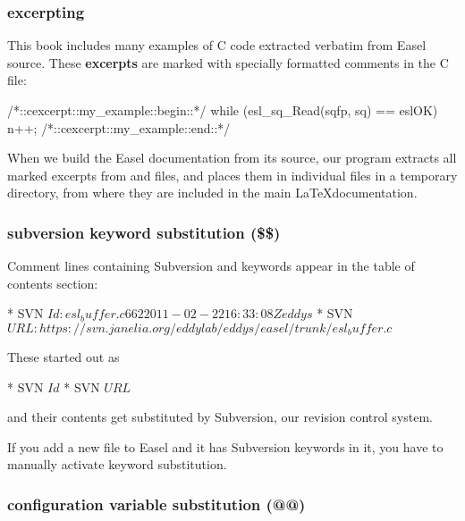 \subsubsection{excerpting}

This book includes many examples of C code extracted verbatim from
Easel source.  These {\bfseries excerpts} are marked with specially
formatted comments in the C file:

\begin{cchunk}
/*::cexcerpt::my_example::begin::*/
   while (esl_sq_Read(sqfp, sq) == eslOK)
     { n++; }
/*::cexcerpt::my_example::end::*/
\end{cchunk}

When we build the Easel documentation from its source, our
 program extracts all marked excerpts from 
and  files, and places them in individual files in a
temporary  directory, from where they are included
in the main \LaTeX documentation.

\subsubsection{subversion keyword substitution (\$\$)}

Comment lines containing Subversion  and 
keywords appear in the table of contents section:

\begin{cchunk}
 * SVN $Id: esl_buffer.c 662 2011-02-22 16:33:08Z eddys $
 * SVN $URL: https://svn.janelia.org/eddylab/eddys/easel/trunk/esl_buffer.c $
\end{cchunk}

These started out as
\begin{cchunk}
 * SVN $Id$
 * SVN $URL$
\end{cchunk}

and their contents get substituted by Subversion, our revision control
system.

If you add a new file to Easel and it has Subversion keywords in it,
you have to manually activate keyword substitution. 


\subsubsection{configuration variable substitution (@@)}

